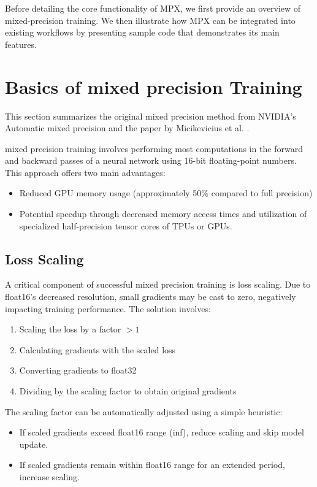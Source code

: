 \documentclass[10pt, a4paper, logo, onecolumn, internal, copyright]{dsme}
\newcommand{\mpx}{\textsc{MPX}}
\begin{document}
Before detailing the core functionality of \mpx{}, we first provide an overview of mixed-precision training. 
We then illustrate how \mpx{} can be integrated into existing workflows by presenting sample code that demonstrates its main features.

\section{Basics of mixed precision Training}
This section summarizes the original mixed precision method from NVIDIA's Automatic mixed precision \citep{mixed_precision_paper} and the paper by Micikevicius et al. \citep{mixed_precision_paper}.

mixed precision training involves performing most computations in the forward and backward passes of a neural network using 16-bit floating-point numbers. This approach offers two main advantages:
\begin{itemize}
    \item Reduced GPU memory usage (approximately 50\% compared to full precision)
    \item Potential speedup through decreased memory access times and utilization of specialized half-precision tensor cores of TPUs or GPUs.
\end{itemize}

\subsection{Loss Scaling}
A critical component of successful mixed precision training is loss scaling. Due to float16's decreased resolution, small gradients may be cast to zero, negatively impacting training performance. The solution involves:
\begin{enumerate}
    \item Scaling the loss by a factor $> 1$
    \item Calculating gradients with the scaled loss
    \item Converting gradients to float32
    \item Dividing by the scaling factor to obtain original gradients
\end{enumerate}

The scaling factor can be automatically adjusted using a simple heuristic:
\begin{itemize}
    \item If scaled gradients exceed float16 range (inf), reduce scaling and skip model update.
    \item If scaled gradients remain within float16 range for an extended period, increase scaling.
\end{itemize}
\end{document}
